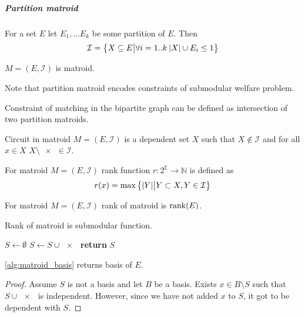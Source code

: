 \subparagraph{Partition matroid}
For a set $E$ let $E_1,\dots E_k$ be some partition of $E$. Then
\begin{align}
\mathcal{I}= \qty\big{ X\subseteq E \big\vert \forall i=1..k \: \abs{X}\cup E_i  \leq 1  }
\end{align}
\begin{prop}
	$M=(E,\mathcal{I})$ is matroid.
\end{prop}
Note that partition matroid encodes constraints of submodular welfare problem.

Constraint of matching in the bipartite graph can be defined as intersection of two partition matroids.

\begin{definition}[Circuit]
	Circuit in matroid $M=(E,\mathcal{I})$ is a dependent set $X$ such that $X\notin \mathcal{I}$ and for all $x\in X$ $X\setminus \qty{x} \in \mathcal{I}$.
\end{definition}
\begin{definition}
For matroid $M=(E,\mathcal{I})$ rank function $r: 2^{\mathbb{E}} \to \mathbb{N}$ is defined as
\begin{align}
r(x) = \max \qty\big{\abs{Y} \big| Y\subset{X}, Y\in \mathcal{I}}
\end{align}
\end{definition}
\begin{definition}
For matroid $M=(E,\mathcal{I})$ rank of matroid is $\rank(E)$.
\end{definition}
\begin{prop}
	Rank of matroid is submodular function.
\end{prop}


\begin{algorithm}
	\caption{}\label{alg:matroid_basis}
	\begin{algorithmic}[1]
		\State $S \gets \emptyset$
		\State $S\gets S\cup \qty{x}$
		\EndIf
		\EndFor
		\State \textbf{return} $S$
		\EndProcedure
	\end{algorithmic}
\end{algorithm}

\begin{prop}
	\vref{alg:matroid_basis} returns basis of $E$.
	\begin{proof}
		Assume $S$ is not a basis and let $B$ be a basis. Exists $x\in B\setminus S$ such that $S\cup \qty{x}$ is independent. However, since we have not added $x$ to $S$, it got to be dependent with $S$.
	\end{proof}
\end{prop}


